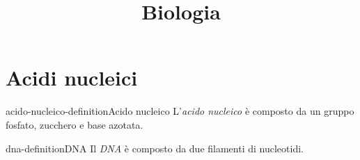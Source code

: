 \documentclass[preview]{standalone}
\begin{document}
\title{Biologia}
\genpage

\section{Acidi nucleici}


\begin{snippetdefinition}{acido-nucleico-definition}{Acido nucleico}
    L'\textit{acido nucleico} è composto da un gruppo fosfato, zucchero e base azotata.
\end{snippetdefinition}

\begin{snippetdefinition}{dna-definition}{DNA}
    Il \textit{DNA} è composto da due filamenti di nucleotidi.
\end{snippetdefinition}

\end{document}
